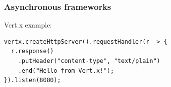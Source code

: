 \documentclass[10pt,utf8]{beamer}
\begin{document}
\begin{frame}[fragile]
    \frametitle{Asynchronous frameworks}

    \vspace{0.5cm}

Vert.x example:
    \begin{lstlisting}[style=java]
vertx.createHttpServer().requestHandler(r -> {
  r.response()
    .putHeader("content-type", "text/plain")
    .end("Hello from Vert.x!");
}).listen(8080);
    \end{lstlisting}
\end{frame}
\end{document}
